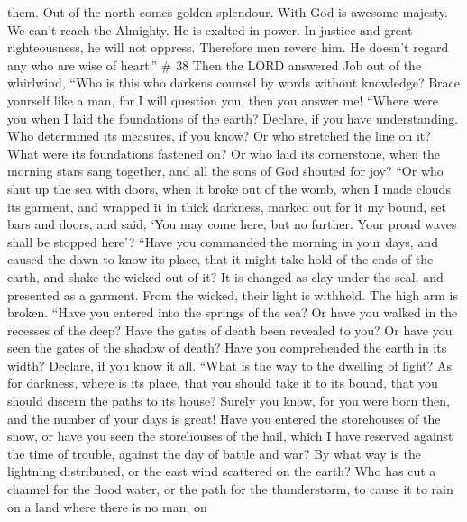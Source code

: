 them.  Out of the north comes golden splendour. With God is
awesome majesty.  We can't reach the Almighty. He is
exalted in power. In justice and great righteousness, he will not
oppress.  Therefore men revere him. He doesn't regard any
who are wise of heart.'' \# 38  Then the LORD answered Job
out of the whirlwind,  ``Who is this who darkens counsel by
words without knowledge?  Brace yourself like a man, for I
will question you, then you answer me!  ``Where were you
when I laid the foundations of the earth? Declare, if you have
understanding.  Who determined its measures, if you know? Or
who stretched the line on it?  What were its foundations
fastened on? Or who laid its cornerstone,  when the morning
stars sang together, and all the sons of God shouted for joy?
 ``Or who shut up the sea with doors, when it broke out of
the womb,  when I made clouds its garment, and wrapped it in
thick darkness,  marked out for it my bound, set bars and
doors,  and said, `You may come here, but no further. Your
proud waves shall be stopped here'?  ``Have you commanded
the morning in your days, and caused the dawn to know its place,
 that it might take hold of the ends of the earth, and
shake the wicked out of it?  It is changed as clay under
the seal, and presented as a garment.  From the wicked,
their light is withheld. The high arm is broken.  ``Have
you entered into the springs of the sea? Or have you walked in the
recesses of the deep?  Have the gates of death been
revealed to you? Or have you seen the gates of the shadow of death?
 Have you comprehended the earth in its width? Declare, if
you know it all.  ``What is the way to the dwelling of
light? As for darkness, where is its place,  that you
should take it to its bound, that you should discern the paths to its
house?  Surely you know, for you were born then, and the
number of your days is great!  Have you entered the
storehouses of the snow, or have you seen the storehouses of the hail,
 which I have reserved against the time of trouble, against
the day of battle and war?  By what way is the lightning
distributed, or the east wind scattered on the earth?  Who
has cut a channel for the flood water, or the path for the thunderstorm,
 to cause it to rain on a land where there is no man, on
